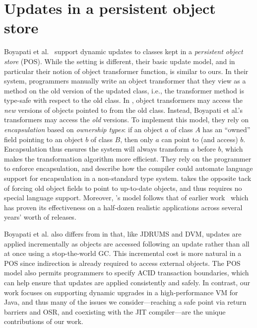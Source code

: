 % 

\section{Updates in a persistent object store}
\label{sec:boyapati}

Boyapati et al.~\cite{boyapati03lazy} support dynamic updates to classes
kept in a \emph{persistent object store} (POS).  While the setting is
different, their basic update model, and in particular their notion of
object transformer function, is similar to ours.  In their system,
programmers manually write an object transformer that they view as a method
on the old version of the updated class, i.e., the transformer method is
type-safe with respect to the old class.  In \JV, object transformers may
access the \emph{new} versions of objects pointed to from the old class.
Instead, Boyapati et al.'s transformers may access the \emph{old} versions.
To implement this model, they rely on \emph{encapsulation} based on
\emph{ownership types}: if an object $a$ of class $A$ has an ``owned''
field pointing to an object $b$ of class $B$, then only $a$ can point to
(and access) $b$.  Encapsulation thus ensures the system will always
transform $a$ before $b$, which makes the transformation algorithm more
efficient.  They rely on the programmer to enforce encapsulation, and
describe how the compiler could automate language support for encapsulation
in a non-standard type system.  \JV takes the opposite tack of forcing old
object fields to point to up-to-date objects, and thus requires no special
language support.  Moreover, \JV's model follows that of earlier
work~\cite{k42usenix, neamtiu06dsu, neamtiu09stump, upstare} which has
proven its effectiveness on a half-dozen realistic applications across
several years' worth of releases.

Boyapati et al. also differs from \JV in that, like JDRUMS and DVM, updates
are applied incrementally as objects are accessed following an update
rather than all at once using a stop-the-world GC\@. This incremental cost
is more natural in a POS since indirection is already required to access
external objects. The POS model also permits programmers to specify ACID
transaction boundaries, which can help ensure that updates are applied
consistently and safely.  In contrast, our work focuses on supporting
dynamic upgrades in a high-performance VM for Java, and thus many of the
issues we consider---reaching a safe point via return barriers and OSR, and
coexisting with the JIT compiler---are the unique contributions of our
work.
